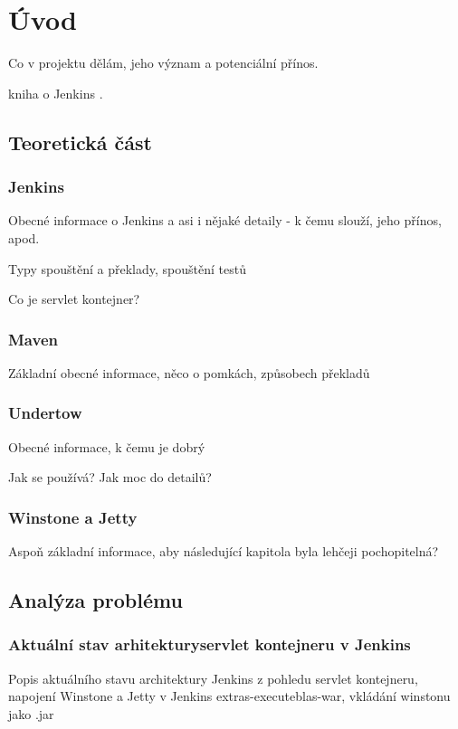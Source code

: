 



\chapter{Úvod}
    Co v projektu dělám, jeho význam a potenciální přínos.

    kniha o Jenkins \cite{JenkinsBook}.

\section{Teoretická část}
    \subsection {Jenkins}
        Obecné informace o Jenkins a asi i nějaké detaily - k čemu slouží, jeho přínos, apod.
        
        Typy spouštění a překlady, spouštění testů

        Co je servlet kontejner?

    \subsection{Maven}
        Základní obecné informace, něco o pomkách, způsobech překladů

    \subsection{Undertow}
        Obecné informace, k čemu je dobrý

        Jak se používá? Jak moc do detailů?

    \subsection{Winstone a Jetty}
        Aspoň základní informace, aby následující kapitola byla lehčeji pochopitelná?
        
\section{Analýza problému}
    
    \subsection{Aktuální stav arhitekturyservlet kontejneru v Jenkins}
        Popis aktuálního stavu architektury Jenkins z pohledu servlet kontejneru, napojení Winstone a Jetty v Jenkins
        extras-executeblas-war, vkládání winstonu jako .jar

